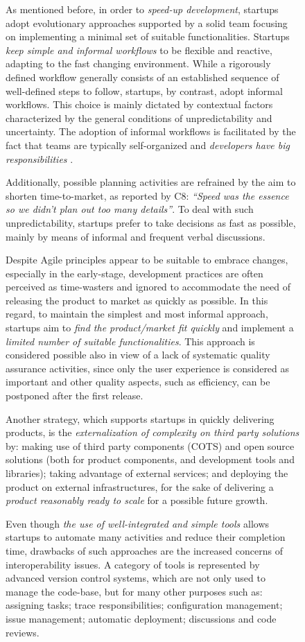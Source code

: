 \documentclass[12pt,journal,compsoc]{../sty/IEEEtran}
\begin{document}
\begin{table}[!t]
\begin{figure}[!t]
\begin{compactitem}
As mentioned before, in order to \textit{speed-up development}, startups adopt
evolutionary approaches supported by a solid team focusing on implementing a
minimal set of suitable functionalities. Startups \textit{keep simple and
informal workflows} to be flexible and reactive, adapting to the fast changing
environment. While a rigorously defined workflow generally consists of an
established sequence of well-defined steps to follow, startups, by contrast,
adopt informal workflows. This choice is mainly dictated by contextual factors
characterized by the general conditions of unpredictability and uncertainty. The
adoption of informal workflows is facilitated by the fact that teams are
typically self-organized and \textit{developers have big responsibilities} .

Additionally, possible planning activities are refrained by the aim to shorten
time-to-market, as reported by C8: \textit{``Speed was the essence so we didn't
plan out too many details''}. To deal with such unpredictability, startups
prefer to take decisions as fast as possible, mainly by means of informal and
frequent verbal discussions.

Despite Agile principles appear to be suitable to embrace changes, especially
in the early-stage, development practices are often perceived as time-wasters
and ignored to accommodate the need of releasing the product to market as
quickly as possible. In this regard, to maintain the simplest and most informal
approach, startups aim to \textit{find the product/market fit quickly} and
implement a \textit{limited number of suitable functionalities}. This approach
is considered possible also in view of a lack of systematic quality assurance
activities, since only the user experience is considered as important and other
quality aspects, such as efficiency, can be postponed after the first release.

Another strategy, which supports startups in quickly delivering products, is
the \textit{externalization of complexity on third party solutions} by: making
use of third party components (COTS) and open source solutions (both for
product components, and development tools and libraries); taking advantage of
external services; and deploying the product on external infrastructures, for
the sake of delivering a \textit{product reasonably ready to scale} for a
possible future growth.

Even though \textit{the use of well-integrated and simple tools} allows
startups to automate many activities and reduce their completion time, drawbacks
of such approaches are the increased concerns of interoperability issues. A
category of tools is represented by advanced version control systems, which are
not only used to manage the code-base, but for many other purposes such as:
assigning tasks; trace responsibilities; configuration management; issue
management; automatic deployment; discussions and code reviews.


\end{compactitem}
\end{figure}
\end{table}
\end{document}
